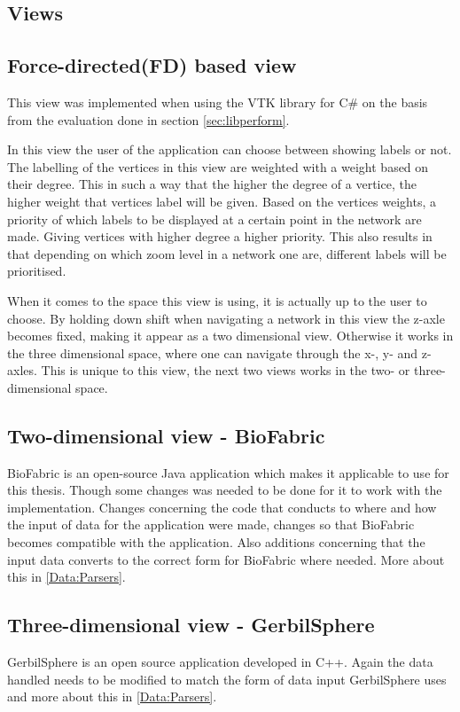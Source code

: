 \documentclass[a4paper,11pt]{kth-mag}
\begin{document}
\begin{appendices}
\section{Views}
\subsection{Force-directed(FD) based view}
\label{FD:View:appendix}
This view was implemented when using the VTK library for C\# on the basis 
from the evaluation done in section \ref{sec:libperform}.

In this view the user of the application can choose between showing labels or not. The labelling of the vertices in this view are weighted with a weight based on their degree. This in such a way that the higher
 the degree of a vertice, the higher weight that vertices label will be given. Based on the vertices weights, a priority of which labels to be displayed at a certain point in the network are made. Giving vertices
 with higher degree a higher priority. This also results in that depending on which zoom level in a network one are, different labels will be prioritised.

 When it comes to the space this view is using, it is actually up to the user to choose. By holding down shift when navigating a network in this view the z-axle becomes fixed, making it appear as a two dimensional view. 
Otherwise it works in the three dimensional space, where one can navigate through the x-, y- and z-axles. This is unique to this view, the next two views works in the two- or three-dimensional space. 

\subsection{Two-dimensional view - BioFabric}
BioFabric is an open-source Java application which makes it applicable to use for this thesis. Though some changes was needed to be done for it to work with the implementation. Changes concerning the code that conducts to where
and how the input of data for the application were made, changes so that BioFabric becomes compatible with the application. Also additions concerning that the input data converts to the correct form for BioFabric where needed.
 More about this in \ref{Data:Parsers}.

\subsection{Three-dimensional view - GerbilSphere}
GerbilSphere is an open source application developed in C++. Again the data handled needs to be modified to match the form of data input GerbilSphere uses
and more about this in \ref{Data:Parsers}.


\end{appendices}
\end{document}
